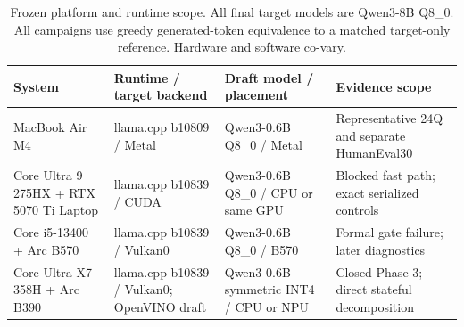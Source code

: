 \begin{table}[t]
\caption{Frozen platform and runtime scope. All final target models are Qwen3-8B Q8\_0. All campaigns use greedy generated-token equivalence to a matched target-only reference. Hardware and software co-vary.}
\label{tab:platforms}
\centering
\begin{tabular}{>{\raggedright\arraybackslash}p{1.4in}>{\raggedright\arraybackslash}p{1.65in}>{\raggedright\arraybackslash}p{1.35in}>{\raggedright\arraybackslash}p{1.5in}}
\toprule
System & Runtime / target backend & Draft model / placement & Evidence scope \\
\midrule
MacBook Air M4 & llama.cpp b10809 / Metal & Qwen3-0.6B Q8\_0 / Metal & Representative 24Q and separate HumanEval30 \\
Core Ultra 9 275HX + RTX 5070 Ti Laptop & llama.cpp b10839 / CUDA & Qwen3-0.6B Q8\_0 / CPU or same GPU & Blocked fast path; exact serialized controls \\
Core i5-13400 + Arc B570 & llama.cpp b10839 / Vulkan0 & Qwen3-0.6B Q8\_0 / B570 & Formal gate failure; later diagnostics \\
Core Ultra X7 358H + Arc B390 & llama.cpp b10839 / Vulkan0; OpenVINO draft & Qwen3-0.6B symmetric INT4 / CPU or NPU & Closed Phase 3; direct stateful decomposition \\
\bottomrule
\end{tabular}
\end{table}
